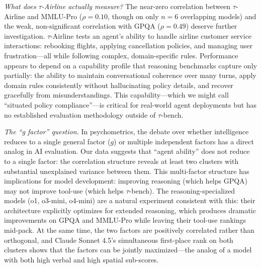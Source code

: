 \documentclass[sigconf]{acmart}
\begin{document}
\textit{What does $\tau$-Airline actually measure?} The near-zero correlation between $\tau$-Airline and MMLU-Pro ($\rho = 0.10$, though on only $n = 6$ overlapping models) and the weak, non-significant correlation with GPQA ($\rho = 0.49$) deserve further investigation. $\tau$-Airline tests an agent's ability to handle airline customer service interactions: rebooking flights, applying cancellation policies, and managing user frustration---all while following complex, domain-specific rules. Performance appears to depend on a capability profile that reasoning benchmarks capture only partially: the ability to maintain conversational coherence over many turns, apply domain rules consistently without hallucinating policy details, and recover gracefully from misunderstandings. This capability---which we might call ``situated policy compliance''---is critical for real-world agent deployments but has no established evaluation methodology outside of $\tau$-bench.

\textit{The ``g factor'' question.} In psychometrics, the debate over whether intelligence reduces to a single general factor ($g$) or multiple independent factors has a direct analog in AI evaluation. Our data suggests that ``agent ability'' does not reduce to a single factor: the correlation structure reveals at least two clusters with substantial unexplained variance between them. This multi-factor structure has implications for model development: improving reasoning (which helps GPQA) may not improve tool-use (which helps $\tau$-bench). The reasoning-specialized models (o1, o3-mini, o4-mini) are a natural experiment consistent with this: their architecture explicitly optimizes for extended reasoning, which produces dramatic improvements on GPQA and MMLU-Pro while leaving their tool-use rankings mid-pack. At the same time, the two factors are positively correlated rather than orthogonal, and Claude Sonnet 4.5's simultaneous first-place rank on both clusters shows that the factors can be jointly maximized---the analog of a model with both high verbal and high spatial sub-scores.
\end{document}
